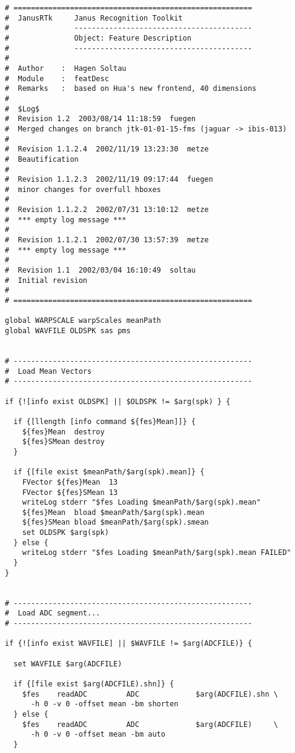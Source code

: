 \begin{verbatim}
# =======================================================
#  JanusRTk     Janus Recognition Toolkit
#               -----------------------------------------
#               Object: Feature Description
#               -----------------------------------------
#
#  Author    :  Hagen Soltau
#  Module    :  featDesc
#  Remarks   :  based on Hua's new frontend, 40 dimensions
#
#  $Log$
#  Revision 1.2  2003/08/14 11:18:59  fuegen
#  Merged changes on branch jtk-01-01-15-fms (jaguar -> ibis-013)
#
#  Revision 1.1.2.4  2002/11/19 13:23:30  metze
#  Beautification
#
#  Revision 1.1.2.3  2002/11/19 09:17:44  fuegen
#  minor changes for overfull hboxes
#
#  Revision 1.1.2.2  2002/07/31 13:10:12  metze
#  *** empty log message ***
#
#  Revision 1.1.2.1  2002/07/30 13:57:39  metze
#  *** empty log message ***
#
#  Revision 1.1  2002/03/04 16:10:49  soltau
#  Initial revision
#
# =======================================================

global WARPSCALE warpScales meanPath
global WAVFILE OLDSPK sas pms


# -------------------------------------------------------
#  Load Mean Vectors
# -------------------------------------------------------

if {![info exist OLDSPK] || $OLDSPK != $arg(spk) } {

  if {[llength [info command ${fes}Mean]]} { 
    ${fes}Mean  destroy
    ${fes}SMean destroy
  }

  if {[file exist $meanPath/$arg(spk).mean]} {
    FVector ${fes}Mean  13
    FVector ${fes}SMean 13
    writeLog stderr "$fes Loading $meanPath/$arg(spk).mean"
    ${fes}Mean  bload $meanPath/$arg(spk).mean
    ${fes}SMean bload $meanPath/$arg(spk).smean
    set OLDSPK $arg(spk)
  } else {
    writeLog stderr "$fes Loading $meanPath/$arg(spk).mean FAILED"
  }
}


# -------------------------------------------------------
#  Load ADC segment...
# -------------------------------------------------------

if {![info exist WAVFILE] || $WAVFILE != $arg(ADCFILE)} {

  set WAVFILE $arg(ADCFILE)

  if {[file exist $arg(ADCFILE).shn]} {
    $fes    readADC         ADC             $arg(ADCFILE).shn \
      -h 0 -v 0 -offset mean -bm shorten
  } else {
    $fes    readADC         ADC             $arg(ADCFILE)     \
      -h 0 -v 0 -offset mean -bm auto
  }


\end{verbatim}
